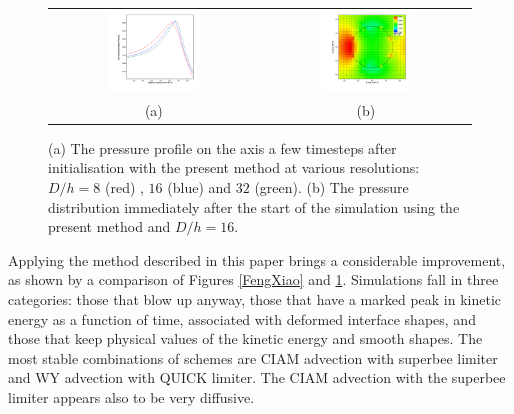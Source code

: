 \begin{figure}
\begin{center}
\begin{tabular}{cc}
\includegraphics[width=0.45\textwidth]{Figures/Sagar/pressure_rd_MC.png} &
\includegraphics[width=0.45\textwidth]
{Figures/Sagar/16ppd_pressure_corrected.png}\\
(a) & (b)
\end{tabular}
\end{center}
\caption{ (a) The pressure profile on the axis a few timesteps after 
initialisation with the present 
method at various resolutions: $D/h = 8$ (red) , $16$ (blue) and $32$ (green). 
(b) The pressure distribution immediately after the start of the simulation 
using the present method and   $D/h = 16$.}
\label{FengXiao_corrected}
\end{figure}

Applying the method described in this paper brings a considerable improvement,
as shown by a comparison of Figures \ref{FengXiao} and \ref{FengXiao_corrected}. 
Simulations fall in three categories: 
those that blow up anyway, those that have a marked peak in kinetic energy as 
a function of time, associated with deformed interface shapes, 
and those that keep physical values of the kinetic energy and smooth shapes.
The most stable combinations of schemes are CIAM advection with superbee limiter
and WY advection with QUICK limiter. 
The CIAM advection with the superbee limiter appears also to be very diffusive. 

